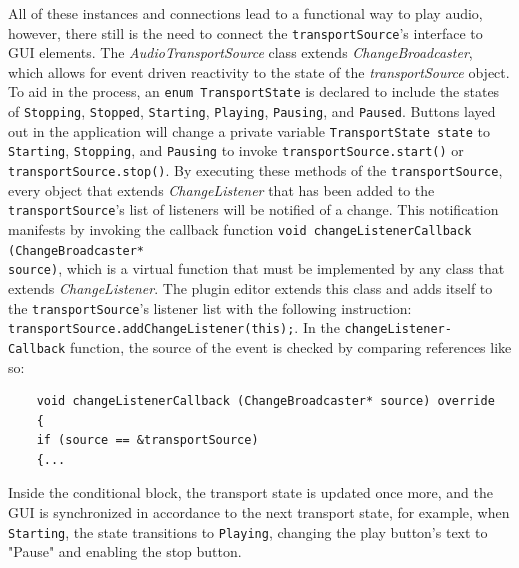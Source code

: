 \documentclass[12pt, a4paper, hidelinks]{report}
\begin{document}
	All of these instances and connections lead to a functional way to play audio, however, there still is the need to connect the \texttt{transportSource}'s interface to GUI elements. The \textit{AudioTransportSource} class extends \textit{ChangeBroadcaster}, which allows for event driven reactivity to the state of the \textit{transportSource} object. To aid in the process, an \texttt{enum TransportState} is declared to include the states of \texttt{Stopping}, \texttt{Stopped}, \texttt{Starting}, \texttt{Playing}, \texttt{Pausing}, and \texttt{Paused}. Buttons layed out in the application will change a private variable \texttt{TransportState state} to \texttt{Starting}, \texttt{Stopping}, and \texttt{Pausing} to invoke \texttt{transportSource.start()} or \texttt{transportSource.stop()}. By executing these methods of the \texttt{transportSource}, every object that extends \textit{ChangeListener} that has been added to the \texttt{transportSource}'s list of listeners will be notified of a change. This notification manifests by invoking the callback function \texttt{void changeListenerCallback (ChangeBroadcaster*\\ source)}, which is a virtual function that must be implemented by any class that extends \textit{ChangeListener}. The plugin editor extends this class and adds itself to the \texttt{transportSource}'s listener list with the following instruction: \texttt{transportSource.addChangeListener(this);}. In the \texttt{changeListener-\\
		Callback} function, the source of the event is checked by comparing references like so:
	\begin{verbatim}
	void changeListenerCallback (ChangeBroadcaster* source) override
	{
	if (source == &transportSource)
	{...
	\end{verbatim}
	Inside the conditional block, the transport state is updated once more, and the GUI is synchronized in accordance to the next transport state, for example, when \texttt{Starting}, the state transitions to \texttt{Playing}, changing the play button's text to "Pause" and enabling the stop button. \par
	
	
\end{document}
